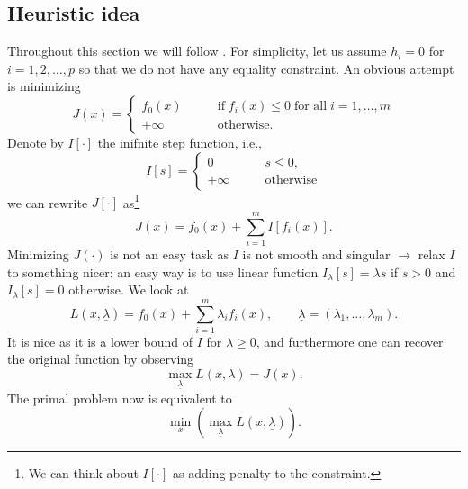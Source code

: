 \subsection{Heuristic idea} Throughout this section we will follow \cite{DavidKnowles2010}. For simplicity, let us assume $h_i = 0$ for $i=1,2,\ldots,p$ so that we do not have any equality constraint. An obvious attempt is minimizing
\begin{equation*}
    J(x) = 
    \begin{cases}
        f_0(x) &\qquad\text{if}\; f_i(x)\leq 0\;\text{for all}\;i=1,\ldots, m\\
        +\infty &\qquad\text{otherwise}.
    \end{cases}
\end{equation*}
Denote by $I[\cdot]$ the inifnite step function, i.e.,
\begin{equation*}
    I[s] = 
    \begin{cases}
        0       &\qquad s\leq 0,\\
        +\infty &\qquad \text{otherwise}
    \end{cases}
\end{equation*}
we can rewrite $J[\cdot]$ as\footnote{We can think about $I[\cdot]$ as adding penalty to the constraint.}
\begin{equation*}
    J(x) = f_0(x) + \sum_{i=1}^m I[f_i(x)].
\end{equation*}
Minimizing $J(\cdot)$ is not an easy task as $I$ is not smooth and singular $\longrightarrow$ relax $I$ to something nicer: an easy way is to use linear function $I_\lambda[s] = \lambda s$ if $s>0$ and $I_\lambda[s] = 0$ otherwise. We look at
\begin{equation*}
    L(x,\underline{\lambda}) = f_0(x) + \sum_{i=1}^m \lambda_i f_i(x), \qquad \underline{\lambda} = (\lambda_1,\ldots, \lambda_m).
\end{equation*}
It is nice as it is a lower bound of $I$ for $\lambda \geq 0$, and furthermore one can recover the original function by observing
\begin{equation*}
    \max_{\underline{\lambda}} L(x,\lambda) = J(x).
\end{equation*}
The primal problem now is equivalent to 
\begin{equation*}
    \min_{x}\left( \max_{\underline{\lambda}} L(x,\underline{\lambda})\right).
\end{equation*}
